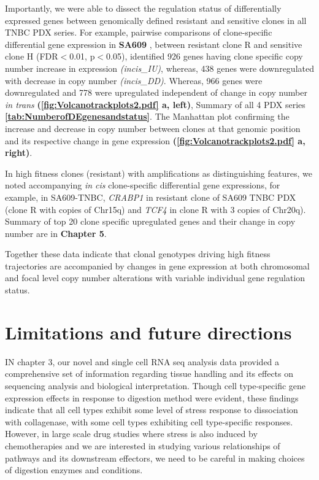 
Importantly, we were able to dissect the regulation status of  differentially expressed genes between genomically defined resistant and sensitive clones in all TNBC PDX series. For example, pairwise comparisons of clone-specific differential gene expression in \textbf{SA609} , between resistant clone R and sensitive clone H (FDR$<$0.01, p$<$0.05), identified 926 genes having clone specific copy number increase in expression \textit{(incis\_IU)}, whereas, 438 genes were downregulated with decrease in copy number \textit{(incis\_DD)}. Whereas, 966 genes were downregulated and 778 were upregulated  independent of change in copy number \textit{in trans} \textbf{(\autoref{fig:Volcanotrackplots2.pdf} a, left)}, Summary of all 4 PDX series \textbf{\autoref{tab:NumberofDEgenesandstatus}}. The Manhattan plot confirming the increase and decrease in copy number between clones at that genomic position and its respective change in gene expression \textbf{(\autoref{fig:Volcanotrackplots2.pdf} a, right)}.

In high fitness clones (resistant) with amplifications as distinguishing features, we noted accompanying \textit{in cis} clone-specific differential gene expressions, for example, in SA609-TNBC, \textit{CRABP1} in resistant clone of SA609 TNBC PDX (clone R with copies of Chr15q) and  \textit{TCF4} in clone R with 3 copies of Chr20q). Summary of top 20 clone specific upregulated genes and their change in copy number are in \textbf{Chapter 5}.

Together these data indicate that clonal genotypes driving high fitness trajectories are accompanied by changes in gene expression at both chromosomal and focal level copy number alterations with variable individual gene regulation status.


\section{Limitations and future directions}

IN chapter 3, our novel and single cell RNA seq analysis data provided a comprehensive set of information regarding tissue handling and its effects on sequencing analysis and biological interpretation. Though cell type-specific gene expression effects in response to digestion method were evident, these findings indicate that all cell types exhibit some level of stress response to dissociation with collagenase, with some cell types exhibiting cell type-specific responses. 
However, in large scale drug studies where stress is also induced by chemotherapies and we are interested in studying various relationships of pathways and its downstream effectors, we need to be careful in making choices of digestion enzymes and conditions. 

